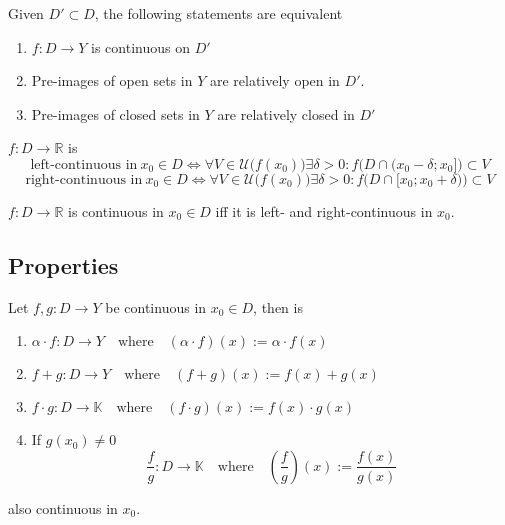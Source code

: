 \begin{theorem}
   Given \(D' \subset D\), the following statements are equivalent
   \begin{enumerate}[label=\roman*, align=Center]
      \item \(f: D \to Y\) is continuous on \(D'\)
      \item Pre-images of open sets in \(Y\) are relatively open in \(D'\).
      \item Pre-images of closed sets in \(Y\) are relatively closed in \(D'\)
   \end{enumerate}
\end{theorem}

\begin{definition}
   \(f: D \to \mathbb{R}\) is
   \[\text{left-continuous in}~x_0 \in D \iff \forall V \in \mathcal{U}\big(f(x_0)\big) \exists \delta > 0: f\big(D \cap (x_0 - \delta; x_0]\big) \subset V\]
   \[\text{right-continuous in}~x_0 \in D \iff \forall V \in \mathcal{U}\big(f(x_0)\big) \exists \delta > 0: f\big(D \cap [x_0; x_0 + \delta)\big) \subset V\]
\end{definition}

\begin{proposition}
   \(f: D \to \mathbb{R}\) is continuous in \(x_0 \in D\) iff it is left- and right-continuous in \(x_0\).
\end{proposition}

\subsection{Properties}
\begin{proposition}
   Let \(f, g: D \to Y\) be continuous in \(x_0 \in D\), then is
   \begin{enumerate}[label=\roman*, align=Center]
      \item \(\alpha \cdot f: D \to Y \quad\text{where}\quad (\alpha \cdot f)(x) := \alpha \cdot f(x)\)
      \item \(f + g: D \to Y \quad\text{where}\quad (f + g)(x) := f(x) + g(x)\)
      \item \(f \cdot g: D \to \mathbb{K} \quad\text{where}\quad (f \cdot g)(x) := f(x) \cdot g(x)\)
      \item If \(g(x_0) \neq 0\)
         \[\frac{f}{g}: D \to \mathbb{K} \quad\text{where}\quad \left(\frac{f}{g}\right)(x) := \frac{f(x)}{g(x)}\]
   \end{enumerate}
   also continuous in \(x_0\).
\end{proposition}

